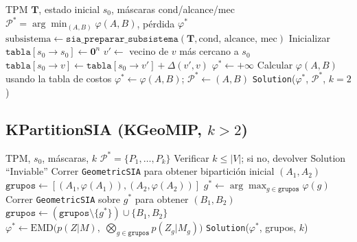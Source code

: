\documentclass[11pt,letterpaper]{article}
\newcommand{\EMD}{\mathrm{EMD}}
\newcommand{\phi}{\varphi}
\newcommand{\tpm}{\mathbf{T}}
\newcommand{\parti}{\mathcal{P}}
\begin{document}
\begin{algorithm}[H]
  \caption{GeometricSIA --- \texttt{aplicar\_estrategia}}
  \label{alg:geo}
  \begin{algorithmic}[1]
    \Require TPM $\tpm$, estado inicial $s_0$, máscaras cond/alcance/mec
    \Ensure $\parti^* = \arg\min_{(A,B)} \phi(A,B)$, pérdida $\phi^*$
    \State $\text{subsistema} \gets \texttt{sia\_preparar\_subsistema}(\tpm, \text{cond, alcance, mec})$
    \State Inicializar $\texttt{tabla}[s_0 \to s_0] \gets \mathbf{0}^n$
        \State $v' \gets$ vecino de $v$ más cercano a $s_0$
        \State $\texttt{tabla}[s_0 \to v] \gets \texttt{tabla}[s_0 \to v'] + \Delta(v', v)$
      \EndFor
    \EndFor
    \State $\phi^* \gets +\infty$
      \State Calcular $\phi(A,B)$ usando la tabla de costos
      \If{$\phi(A,B) < \phi^*$}
        \State $\phi^* \gets \phi(A,B)$;\; $\parti^* \gets (A,B)$
      \EndIf
    \EndFor
    \State \Return \texttt{Solution}($\phi^*$, $\parti^*$, $k=2$)
  \end{algorithmic}
\end{algorithm}

\subsection{KPartitionSIA (KGeoMIP, $k > 2$)}

\begin{algorithm}[H]
  \caption{KPartitionSIA --- Estrategia greedy encadenada}
  \label{alg:kpart}
  \begin{algorithmic}[1]
    \Require TPM, $s_0$, máscaras, $k$
    \Ensure $\parti^* = \{P_1,\ldots,P_k\}$
    \State Verificar $k \le |V|$; si no, devolver Solution ``Inviable''
    \State Correr \texttt{GeometricSIA} para obtener bipartición inicial $(A_1, A_2)$
    \State $\texttt{grupos} \gets [(A_1, \phi(A_1)), (A_2, \phi(A_2))]$
      \State $g^* \gets \arg\max_{g \in \texttt{grupos}} \phi(g)$
      \State Correr \texttt{GeometricSIA} sobre $g^*$ para obtener $(B_1, B_2)$
      \State $\texttt{grupos} \gets (\texttt{grupos} \setminus \{g^*\}) \cup \{B_1, B_2\}$
    \EndFor
    \State $\phi^* \gets \EMD\bigl(p(Z|M),\;\bigotimes_{g \in \texttt{grupos}} p(Z_g|M_g)\bigr)$
    \State \Return \texttt{Solution}($\phi^*$, grupos, $k$)
  \end{algorithmic}
\end{algorithm}
\end{document}

